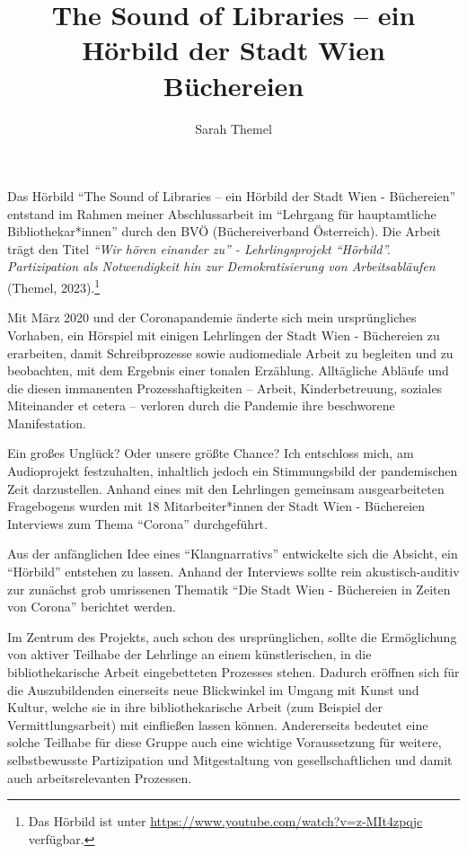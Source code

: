 \documentclass[a4paper,
fontsize=11pt,
oneside,
numbers=noperiodatend,
parskip=half-,
bibliography=totoc,
final
]{scrartcl}
\title{\LARGE{The Sound of Libraries -- ein Hörbild der Stadt Wien Büchereien}}%
\author{Sarah Themel} %
\date{}
\begin{document}
\maketitle
\thispagestyle{fancyplain} 


Das Hörbild \enquote{The Sound of Libraries -- ein Hörbild der Stadt
Wien - Büchereien} entstand im Rahmen meiner Abschlussarbeit im
\enquote{Lehrgang für hauptamtliche Bibliothekar*innen} durch den BVÖ
(Büchereiverband Österreich). Die Arbeit trägt den Titel \emph{\enquote{Wir
hören einander zu} - Lehrlingsprojekt \enquote{Hörbild}. Partizipation
als Notwendigkeit hin zur Demokratisierung von Arbeitsabläufen} (Themel,
2023).\footnote{Das Hörbild ist unter \url{https://www.youtube.com/watch?v=z-MIt4zpqjc} verfügbar.}

Mit März 2020 und der Coronapandemie änderte sich mein ursprüngliches
Vorhaben, ein Hörspiel mit einigen Lehrlingen der Stadt Wien -
Büchereien zu erarbeiten, damit Schreibprozesse sowie audiomediale
Arbeit zu begleiten und zu beobachten, mit dem Ergebnis einer tonalen
Erzählung. Alltägliche Abläufe und die diesen immanenten
Prozesshaftigkeiten -- Arbeit, Kinderbetreuung, soziales Miteinander et
cetera -- verloren durch die Pandemie ihre beschworene Manifestation.

Ein großes Unglück? Oder unsere größte Chance? Ich entschloss mich, am
Audioprojekt festzuhalten, inhaltlich jedoch ein Stimmungsbild der
pandemischen Zeit darzustellen. Anhand eines mit den Lehrlingen
gemeinsam ausgearbeiteten Fragebogens wurden mit 18 Mitarbeiter*innen
der Stadt Wien - Büchereien Interviews zum Thema \enquote{Corona}
durchgeführt.

Aus der anfänglichen Idee eines \enquote{Klangnarrativs} entwickelte
sich die Absicht, ein \enquote{Hörbild} entstehen zu lassen. Anhand der
Interviews sollte rein akustisch-auditiv zur zunächst grob umrissenen
Thematik \enquote{Die Stadt Wien - Büchereien in Zeiten von Corona}
berichtet werden.

Im Zentrum des Projekts, auch schon des ursprünglichen, sollte die
Ermöglichung von aktiver Teilhabe der Lehrlinge an einem künstlerischen,
in die bibliothekarische Arbeit eingebetteten Prozesses stehen. Dadurch
eröffnen sich für die Auszubildenden einerseits neue Blickwinkel im
Umgang mit Kunst und Kultur, welche sie in ihre bibliothekarische Arbeit
(zum Beispiel der Vermittlungsarbeit) mit einfließen lassen können.
Andererseits bedeutet eine solche Teilhabe für diese Gruppe auch eine
wichtige Voraussetzung für weitere, selbstbewusste Partizipation und
Mitgestaltung von gesellschaftlichen und damit auch arbeitsrelevanten
Prozessen.
\end{document}
